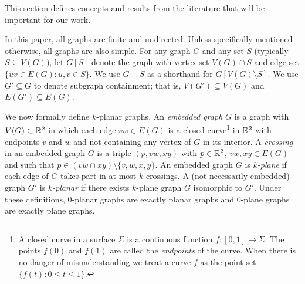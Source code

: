 \documentclass{patmorin}
\renewcommand{\le}{\leqslant}
\begin{document}
This section defines concepts and results from the literature that will be important for our work. 

In this paper, all graphs are finite and undirected. Unless specifically mentioned otherwise, all graphs are also simple. For any graph $G$ and any set $S$ (typically $S\subseteq V(G)$), let $G[S]$  denote the graph with vertex set $V(G)\cap S$ and edge set $\{uv\in E(G) : u,v\in S\}$.  We use $G-S$ as a shorthand for $G[V(G)\setminus S]$. We use $G'\subseteq G$ to denote subgraph containment; that is, $V(G')\subseteq V(G)$ and $E(G')\subseteq E(G)$.

We now formally define $k$-planar graphs.  An \emph{embedded graph} $G$ is a graph with $V(G)\subset\mathbb{R}^2$ in which each edge $vw\in E(G)$ is a closed curve\footnote{A closed curve in a surface $\Sigma$ is a continuous function $f:[0,1]\to \Sigma$. The points $f(0)$ and $f(1)$ are called the \emph{endpoints} of the curve.  When there is no danger of misunderstanding we treat a curve $f$ as the point set $\{f(t):0\le t\le 1\}$.} in $\mathbb{R}^2$ with endpoints $v$ and $w$ and not containing any vertex of $G$ in its interior.  A \emph{crossing} in an embedded graph $G$ is a triple $(p,vw,xy)$ with $p\in\mathbb{R}^2$, $vw,xy\in E(G)$ and such that $p\in (vw\cap xy)\setminus\{v,w,x,y\}$. An embedded graph $G$ is \emph{$k$-plane} if each edge of $G$ takes part in at most $k$ crossings.  A (not necessarily embedded) graph $G'$ is \emph{$k$-planar} if there exists $k$-plane graph $G$ isomorphic to $G'$.  Under these definitions, $0$-planar graphs are exactly planar graphs and $0$-plane graphs are exactly plane graphs. 
\end{document}
